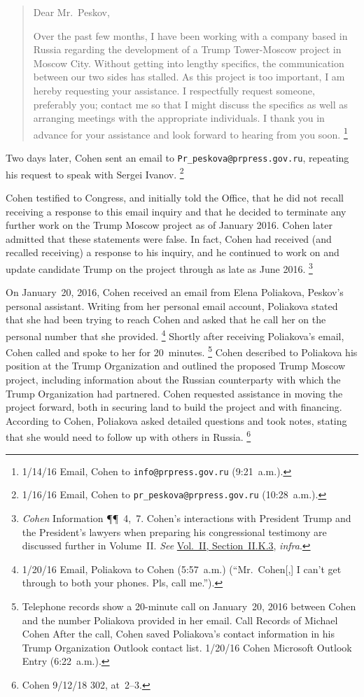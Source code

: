 \begin{quote}
Dear Mr.~Peskov,

Over the past few months, I have been working with a company based in Russia regarding the development of a Trump Tower-Moscow project in Moscow City.
Without getting into lengthy specifics, the communication between our two sides has stalled.
As this project is too important, I am hereby requesting your assistance.
I respectfully request someone, preferably you; contact me so that I might discuss the specifics as well as arranging meetings with the appropriate individuals.
I thank you in advance for your assistance and look forward to hearing from you soon.%
\footnote{1/14/16 Email, Cohen to \verb+info@prpress.gov.ru+ (9:21~a.m.).}
\end{quote}

Two days later, Cohen sent an email to \verb+Pr_peskova@prpress.gov.ru+, repeating his request to speak with Sergei Ivanov.%
\footnote{1/16/16 Email, Cohen to \verb+pr_peskova@prpress.gov.ru+ (10:28~a.m.).}

Cohen testified to Congress, and initially told the Office, that he did not recall receiving a response to this email inquiry and that he decided to terminate any further work on the Trump Moscow project as of January 2016.
Cohen later admitted that these statements were false.
In fact, Cohen had received (and recalled receiving) a response to his inquiry, and he continued to work on and update candidate Trump on the project through as late as June 2016.%
\footnote{\textit{Cohen} Information \P\P~4,~7.
Cohen's interactions with President Trump and the President's lawyers when preparing his congressional testimony are discussed further in Volume~II\null.
\textit{See} \hyperlink{subsubsection.2.2.11.3}{Vol.~II, Section~II.K.3}, \textit{infra}.}

On January~20, 2016, Cohen received an email from Elena Poliakova, Peskov's personal assistant.
Writing from her personal email account, Poliakova stated that she had been trying to reach Cohen and asked that he call her on the personal number that she provided.%
\footnote{1/20/16 Email, Poliakova to Cohen (5:57~a.m.)
(``Mr.~Cohen[,] I can't get through to both your phones. Pls, call me.'').}
Shortly after receiving Poliakova's email, Cohen called and spoke to her for 20~minutes.%
\footnote{Telephone records show a 20-minute call on January~20, 2016 between Cohen and the number Poliakova provided in her email.
Call Records of Michael Cohen 
After the call, Cohen saved Poliakova's contact information in his Trump Organization Outlook contact list.
1/20/16 Cohen Microsoft Outlook Entry (6:22~a.m.).}
Cohen described to Poliakova his position at the Trump Organization and outlined the proposed Trump Moscow project, including information about the Russian counterparty with which the Trump Organization had partnered.
Cohen requested assistance in moving the project forward, both in securing land to build the project and with financing.
According to Cohen, Poliakova asked detailed questions and took notes, stating that she would need to follow up with others in Russia.%
\footnote{Cohen 9/12/18 302, at~2--3.}

